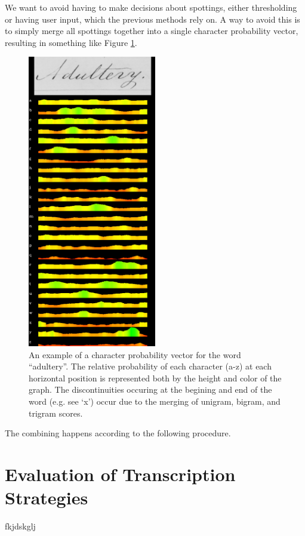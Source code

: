 \documentclass[ms,electronic,twosidetoc,letterpaper,chaptercenter,parttop,lol,lof,lot]{byumsphd}
\begin{document}
We want to avoid having to make decisions about spottings, either thresholding or having user input, which the previous methods rely on. A way to avoid this is to simply merge all spottings together into a single character probability vector, resulting in something like Figure \ref{fig:cpv}.

\begin{figure}
    \centering
    \includegraphics[width=0.5\textwidth]{cpv}
    \caption{An example of a character probability vector for the word ``adultery''. The relative probability of each character (a-z) at each horizontal position is represented both by the height and color of the graph. The discontinuities occuring at the begining and end of the word (e.g. see `x') occur due to the merging of unigram, bigram, and trigram scores.}
    \label{fig:cpv}
\end{figure}

The combining happens according to the following procedure.


\section{Evaluation of Transcription Strategies}
fkjdskglj
\end{document}
